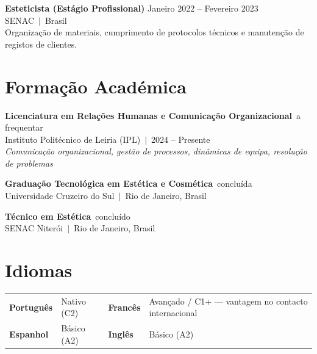 \documentclass[10pt,a4paper]{article}
\begin{document}
\vspace{4pt}
{\small\bfseries Esteticista (Estágio Profissional)}\hfill{\small\color{subtle} Janeiro 2022 -- Fevereiro 2023}\\
{\small\color{accent} SENAC~$|$~Brasil}\\
{\small Organização de materiais, cumprimento de protocolos técnicos e manutenção de registos de clientes.}

\section{Formação Académica}

{\small\bfseries Licenciatura em Relações Humanas e Comunicação Organizacional}~\hfill{\small\color{subtle}a frequentar}\\
{\small Instituto Politécnico de Leiria (IPL)~$|$~2024 -- Presente}\\
{\small\color{subtle}\textit{Comunicação organizacional, gestão de processos, dinâmicas de equipa, resolução de problemas}}

\vspace{3pt}
{\small\bfseries Graduação Tecnológica em Estética e Cosmética}~\hfill{\small\color{subtle}concluída}\\
{\small Universidade Cruzeiro do Sul~$|$~Rio de Janeiro, Brasil}

\vspace{3pt}
{\small\bfseries Técnico em Estética}~\hfill{\small\color{subtle}concluído}\\
{\small SENAC Niterói~$|$~Rio de Janeiro, Brasil}

\section{Idiomas}

\begin{tabularx}{\textwidth}{llll}
  \small\textbf{Português} & \small Nativo (C2) &
  \small\textbf{Francês} & \small Avançado / C1+ {\color{subtle}\small --- vantagem no contacto internacional}\\[2pt]
  \small\textbf{Espanhol} & \small Básico (A2) &
  \small\textbf{Inglês} & \small Básico (A2) \\
\end{tabularx}
\end{document}
